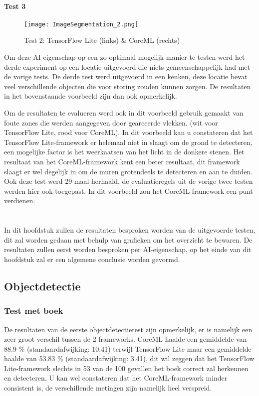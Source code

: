 \subsubsection{Test 3}
\begin{figure}[H]
	\centering
	\texttt{[image: ImageSegmentation\_2.png]}
	\caption{Test 2: TensorFlow Lite (links) \& CoreML (rechts)}
\end{figure}

Om deze AI-eigenschap op een zo optimaal mogelijk manier te testen werd het derde experiment op een locatie uitgevoerd die niets gemeenschappelijk had met de vorige tests. De derde test werd uitgevoerd in een keuken, deze locatie bevat veel verschillende objecten die voor storing zouden kunnen zorgen. De resultaten in het bovenstaande voorbeeld zijn dan ook opmerkelijk.

Om de resultaten te evalueren werd ook in dit voorbeeld gebruik gemaakt van foute zones die werden aangegeven door gearceerde vlekken. (wit voor TensorFlow Lite, rood voor CoreML). In dit voorbeeld kan u constateren dat het TensorFlow Lite-framework er helemaal niet in slaagt om de grond te detecteren, een mogelijke factor is het weerkaatsen van het licht in de donkere stenen. Het resultaat van het CoreML-framework kent een beter resultaat, dit framework slaagt er wel degelijk in om de muren grotendeels te detecteren en aan te duiden. Ook deze test werd 29 maal herhaald, de evaluatieregels uit de vorige twee testen werden hier ook toegepast. In dit voorbeeld zou het CoreML-framework een punt verdienen.

\chapter{}
\label{ch:resultaten}

In dit hoofdstuk zullen de resultaten besproken worden van de uitgevoerde testen, dit zal worden gedaan met behulp van grafieken om het overzicht te bewaren. De resultaten zullen eerst worden besproken per AI-eigenschap, op het einde van dit hoofdstuk zal er een algemene conclusie worden gevormd.

\section{Objectdetectie}

\subsection{Test met boek}
De resultaten van de eerste objectdetectietest zijn opmerkelijk, er is namelijk een zeer groot verschil tussen de 2 frameworks. CoreML haalde een gemiddelde van 88.9 \% (standaardafwijking: 10.41) terwijl TensorFlow Lite maar een gemiddelde haalde van 53.83 \% (standaardafwijking: 3.41), dit wil zeggen dat het TensorFlow Lite-framework slechts in 53 van de 100 gevallen het boek correct zal herkennen en detecteren. U kan wel constateren dat het CoreML-framework minder consistent is, de verschillende metingen zijn namelijk heel verspreid.

